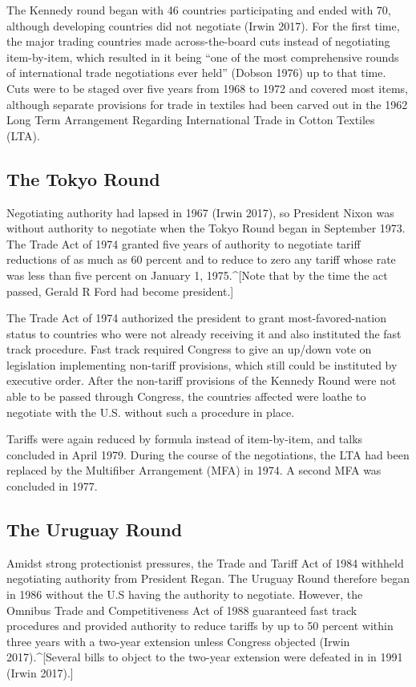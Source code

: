\documentclass[
  12pt,
]{article}
\begin{document}
The Kennedy round began with 46 countries participating and ended with 70, although developing countries did not negotiate (Irwin 2017). For the first time, the major trading countries made across-the-board cuts instead of negotiating item-by-item, which resulted in it being ``one of the most comprehensive rounds of international trade negotiations ever held'' (Dobson 1976) up to that time. Cuts were to be staged over five years from 1968 to 1972 and covered most items, although separate provisions for trade in textiles had been carved out in the 1962 Long Term Arrangement Regarding International Trade in Cotton Textiles (LTA).

\hypertarget{the-tokyo-round}{%
\subsection{The Tokyo Round}\label{the-tokyo-round}}

Negotiating authority had lapsed in 1967 (Irwin 2017), so President Nixon was without authority to negotiate when the Tokyo Round began in September 1973. The Trade Act of 1974 granted five years of authority to negotiate tariff reductions of as much as 60 percent and to reduce to zero any tariff whose rate was less than five percent on January 1, 1975.\^{}{[}Note that by the time the act passed, Gerald R Ford had become president.{]}

The Trade Act of 1974 authorized the president to grant most-favored-nation status to countries who were not already receiving it and also instituted the fast track procedure. Fast track required Congress to give an up/down vote on legislation implementing non-tariff provisions, which still could be instituted by executive order. After the non-tariff provisions of the Kennedy Round were not able to be passed through Congress, the countries affected were loathe to negotiate with the U.S. without such a procedure in place.

Tariffs were again reduced by formula instead of item-by-item, and talks concluded in April 1979. During the course of the negotiations, the LTA had been replaced by the Multifiber Arrangement (MFA) in 1974. A second MFA was concluded in 1977.

\hypertarget{the-uruguay-round}{%
\subsection{The Uruguay Round}\label{the-uruguay-round}}

Amidst strong protectionist pressures, the Trade and Tariff Act of 1984 withheld negotiating authority from President Regan. The Uruguay Round therefore began in 1986 without the U.S having the authority to negotiate. However, the Omnibus Trade and Competitiveness Act of 1988 guaranteed fast track procedures and provided authority to reduce tariffs by up to 50 percent within three years with a two-year extension unless Congress objected (Irwin 2017).\^{}{[}Several bills to object to the two-year extension were defeated in in 1991 (Irwin 2017).{]}
\end{document}
